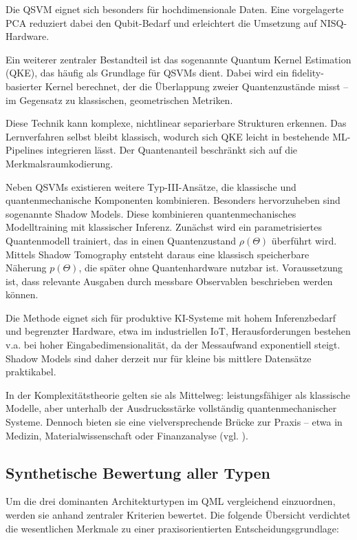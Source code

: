 Die QSVM eignet sich besonders für hochdimensionale Daten. Eine vorgelagerte PCA reduziert dabei den Qubit-Bedarf und erleichtert die Umsetzung auf NISQ-Hardware. 

Ein weiterer zentraler Bestandteil ist das sogenannte Quantum Kernel Estimation (QKE), das häufig als Grundlage für QSVMs dient. Dabei wird ein fidelity-basierter Kernel berechnet, der die Überlappung zweier Quantenzustände misst – im Gegensatz zu klassischen, geometrischen Metriken.

Diese Technik kann komplexe, nichtlinear separierbare Strukturen erkennen. Das Lernverfahren selbst bleibt klassisch, wodurch sich QKE leicht in bestehende ML-Pipelines integrieren lässt. Der Quantenanteil beschränkt sich auf die Merkmalsraumkodierung. 

Neben QSVMs existieren weitere Typ-III-Ansätze, die klassische und quantenmechanische Komponenten kombinieren. Besonders hervorzuheben sind sogenannte Shadow Models. Diese kombinieren quantenmechanisches Modelltraining mit klassischer Inferenz. Zunächst wird ein parametrisiertes Quantenmodell trainiert, das in einen Quantenzustand $\rho(\Theta)$ überführt wird. Mittels Shadow Tomography entsteht daraus eine klassisch speicherbare Näherung $p(\Theta)$, die später ohne Quantenhardware nutzbar ist. Voraussetzung ist, dass relevante Ausgaben durch messbare Observablen beschrieben werden können.

Die Methode eignet sich für produktive KI-Systeme mit hohem Inferenzbedarf und begrenzter Hardware, etwa im industriellen IoT,
Herausforderungen bestehen v.a. bei hoher Eingabedimensionalität, da der Messaufwand exponentiell steigt. Shadow Models sind daher derzeit nur für kleine bis mittlere Datensätze praktikabel.

In der Komplexitätstheorie gelten sie als Mittelweg: leistungsfähiger als klassische Modelle, aber unterhalb der Ausdrucksstärke vollständig quantenmechanischer Systeme. Dennoch bieten sie eine vielversprechende Brücke zur Praxis – etwa in Medizin, Materialwissenschaft oder Finanzanalyse
(vgl. \cite{jerbiShadowsQuantumMachine2024}).


\subsection{Synthetische Bewertung aller Typen}

Um die drei dominanten Architekturtypen im QML vergleichend einzuordnen, werden sie anhand zentraler Kriterien bewertet. Die folgende Übersicht verdichtet die wesentlichen Merkmale zu einer praxisorientierten Entscheidungsgrundlage:

